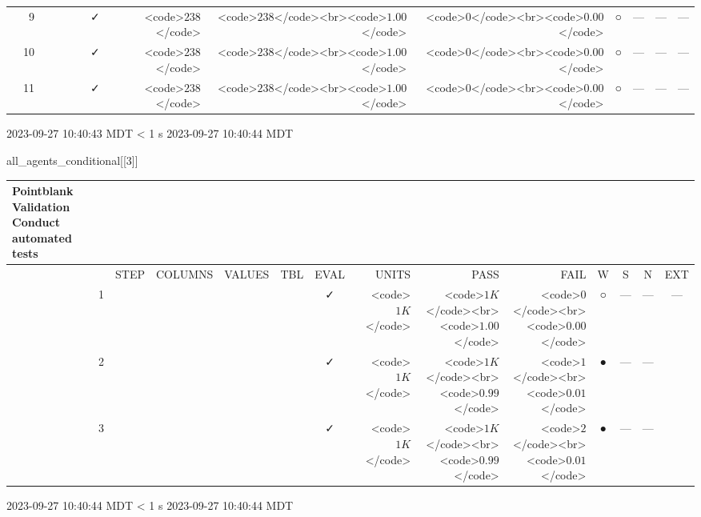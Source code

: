 \documentclass[
  letterpaper,
  DIV=11,
  numbers=noendperiod]{scrreprt}
\newenvironment{Shaded}{\begin{snugshade}}{\end{snugshade}}
\newcommand{\DecValTok}[1]{\textcolor[rgb]{0.68,0.00,0.00}{#1}}
\newcommand{\NormalTok}[1]{\textcolor[rgb]{0.00,0.23,0.31}{#1}}
\begin{document}
\begin{longtable}{lrlllccrrrcccc}
 & 9 &  &  &  &                                                              & ✓ & <code>$238$</code> & <code>$238$</code><br><code>$1.00$</code> & <code>$0$</code><br><code>$0.00$</code> & ○ & --- & --- & --- \\ 
 & 10 &  &  &  &                                                              & ✓ & <code>$238$</code> & <code>$238$</code><br><code>$1.00$</code> & <code>$0$</code><br><code>$0.00$</code> & ○ & --- & --- & --- \\ 
 & 11 &  &  &  &                                                              & ✓ & <code>$238$</code> & <code>$238$</code><br><code>$1.00$</code> & <code>$0$</code><br><code>$0.00$</code> & ○ & --- & --- & --- \\ 
\bottomrule
\end{longtable}
\begin{minipage}{\linewidth}
2023-09-27 10:40:43 MDT
\textless{} 1 s
2023-09-27 10:40:44 MDT\\
\end{minipage}

\begin{Shaded}
\begin{Highlighting}[]
\NormalTok{all\_agents\_conditional[[}\DecValTok{3}\NormalTok{]]}
\end{Highlighting}
\end{Shaded}

\setlength{\LTpost}{0mm}
\begin{longtable}{lrlllccrrrcccc}
\caption*{
{\large Pointblank Validation} \\ 
{\small Conduct automated tests}
} \\ 
\toprule
 &  & STEP & COLUMNS & VALUES & TBL & EVAL & UNITS & PASS & FAIL & W & S & N & EXT \\ 
\midrule
 & 1 &  &  &  &                                                              & ✓ & <code>$1K$</code> & <code>$1K$</code><br><code>$1.00$</code> & <code>$0$</code><br><code>$0.00$</code> & ○ & --- & --- & --- \\ 
 & 2 &  &  &  &                                                              & ✓ & <code>$1K$</code> & <code>$1K$</code><br><code>$0.99$</code> & <code>$1$</code><br><code>$0.01$</code> & ● & --- & --- &  \\ 
 & 3 &  &  &  &                                                              & ✓ & <code>$1K$</code> & <code>$1K$</code><br><code>$0.99$</code> & <code>$2$</code><br><code>$0.01$</code> & ● & --- & --- &  \\ 
\bottomrule
\end{longtable}
\begin{minipage}{\linewidth}
2023-09-27 10:40:44 MDT
\textless{} 1 s
2023-09-27 10:40:44 MDT\\
\end{minipage}
\end{document}
